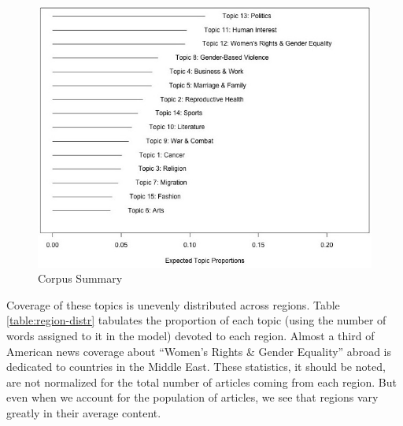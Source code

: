 \documentclass[11pt, oneside]{article}
\begin{document}
\begin{figure}[h]
\begin{center}
\vspace{1cm}
\includegraphics[scale=0.65]{corpus}
\caption{Corpus Summary}\label{fig:summary}
\end{center}
\end{figure}

Coverage of these topics is unevenly distributed across regions. Table \ref{table:region-distr} tabulates the proportion of each topic (using the number of words assigned to it in the model) devoted to each region. Almost a third of American news coverage about ``Women's Rights \& Gender Equality'' abroad is dedicated to countries in the Middle East. These statistics, it should be noted, are not normalized for the total number of articles coming from each region. But even when we account for the population of articles, we see that regions vary greatly in their average content. 
\end{document}

